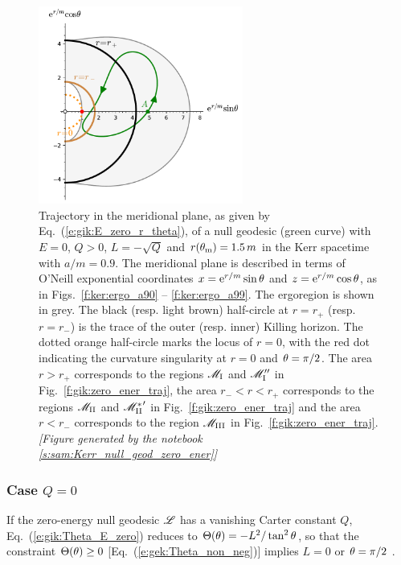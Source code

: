 \begin{figure}
\centerline{\includegraphics[width=0.6\textwidth]{gik_zero_ener_merid.pdf}}
\caption[]{\label{f:gik:zero_ener_merid} \footnotesize
Trajectory in the meridional plane, as given by Eq.~(\ref{e:gik:E_zero_r_theta}), of a null geodesic (green curve)
with $E=0$, $Q>0$, $L = - \sqrt{Q}$ and $r(\theta_{\rm m}) = 1.5 \, m$
in the Kerr spacetime with $a/m = 0.9$.
The meridional plane is described in terms of
O'Neill exponential coordinates $x = \mathrm{e}^{r/m}\sin\theta$ and $z = \mathrm{e}^{r/m}\cos\theta$,
as in Figs.~\ref{f:ker:ergo_a90} -- \ref{f:ker:ergo_a99}.
The ergoregion is shown in grey.
The black (resp. light brown) half-circle at $r=r_+$ (resp. $r=r_-$)
is the trace of the outer (resp. inner) Killing horizon.
The dotted orange half-circle marks the locus of $r=0$, with the
red dot indicating the curvature singularity at $r=0$ and $\theta=\pi/2$.
The area $r> r_+$
corresponds to the regions $\mathscr{M}_{\rm I}$ and $\mathscr{M}_{\rm I}''$ in Fig.~\ref{f:gik:zero_ener_traj},
the area  $r_- < r < r_+$
corresponds to the regions $\mathscr{M}_{\rm II}$ and ${\mathscr{M}_{\rm II}^*}'$  in Fig.~\ref{f:gik:zero_ener_traj} and the area $r < r_-$
corresponds to the region $\mathscr{M}_{\rm III}$ in Fig.~\ref{f:gik:zero_ener_traj}.
\textsl{[Figure generated by the notebook \ref{s:sam:Kerr_null_geod_zero_ener}]}
}
\end{figure}

\subsubsection{Case $Q=0$}

If the zero-energy null geodesic $\mathscr{L}$ has a vanishing Carter constant $Q$, Eq.~(\ref{e:gik:Theta_E_zero}) reduces to $\Theta(\theta) = -L^2 / \tan^2\theta$,
so that the constraint $\Theta(\theta) \geq 0$ [Eq.~(\ref{e:gek:Theta_non_neg})]
implies $L=0$ or $\theta = \pi/2$ .

